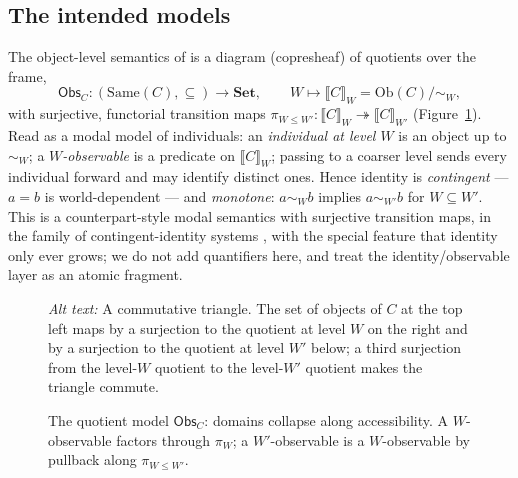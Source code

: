 \documentclass[11pt]{amsart}
\theoremstyle{definition}
\newcommand{\Same}{\mathrm{Same}}
\newcommand{\Ob}{\mathrm{Ob}}
\newcommand{\Obs}{\mathsf{Obs}}
\begin{document}
\subsection{The intended models}
The object-level semantics of \cite{SameA} is a diagram (copresheaf) of
quotients over the frame,
\[
\Obs_C\colon(\Same(C),\subseteq)\to\mathbf{Set},\qquad
W\mapsto\llbracket C\rrbracket_W=\Ob(C)/{\sim_W},
\]
with surjective, functorial transition maps
$\pi_{W\le W'}\colon\llbracket C\rrbracket_W\twoheadrightarrow
\llbracket C\rrbracket_{W'}$ (Figure~\ref{fig:presheaf}). Read
as a modal model of individuals: an \emph{individual at level $W$} is an object
up to $\sim_W$; a \emph{$W$-observable} is a predicate on $\llbracket
C\rrbracket_W$; passing to a coarser level sends every individual forward and
may identify distinct ones. Hence identity is
\emph{contingent} --- $a=b$ is world-dependent --- and \emph{monotone}: $a\sim_Wb$
implies $a\sim_{W'}b$ for $W\subseteq W'$. This is a counterpart-style modal
semantics with surjective transition maps, in the family of contingent-identity
systems \cite{HC96}, with the special feature that identity only ever grows;
we do not add quantifiers here, and treat the identity/observable layer as an
atomic fragment.

\begin{figure}[ht]
\centering
{}
\caption{The quotient model $\Obs_C$: domains collapse along accessibility.
A $W$-observable factors through $\pi_W$; a $W'$-observable is a
$W$-observable by pullback along $\pi_{W\le W'}$.}
\label{fig:presheaf}
\par\smallskip\noindent\textit{Alt text:} A commutative triangle. The set of objects of $C$ at the top left maps by
a surjection to the quotient at level $W$ on the right and by a surjection to
the quotient at level $W'$ below; a third surjection from the level-$W$
quotient to the level-$W'$ quotient makes the triangle commute.
\end{figure}
\end{document}
